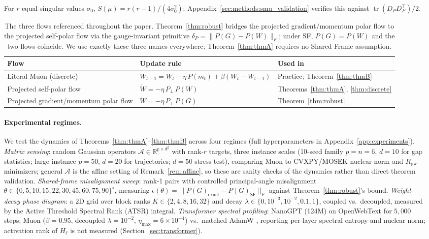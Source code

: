 \documentclass{article}
\begin{document}
For $r$ equal singular values $\sigma_0$, $S(\mu)=r(r-1)/(4\sigma_0^2)$; Appendix~\ref{sec:methods:smu_validation} verifies this against $\operatorname{tr}(D_P D_P^\top)/2$.

\begin{table}[h]
\centering\small
\caption{The three flows referenced throughout the paper. Theorem~\ref{thm:robust} bridges the projected gradient/momentum polar flow to the projected self-polar flow via the gauge-invariant primitive $\delta_P=\|P(G)-P(W)\|_F$; under \textsf{SF}, $P(G)=P(W)$ and the two flows coincide. We use exactly these three names everywhere; Theorem~\ref{thm:thmA} requires no Shared-Frame assumption.}
\label{tab:three_flows_main}
\begin{tabular}{@{}lll@{}}
\toprule
Flow & Update rule & Used in \\
\midrule
Literal Muon (discrete) & $W_{t+1} = W_t - \eta\,P(m_t) + \beta(W_t-W_{t-1})$ & Practice; Theorem~\ref{thm:thmB} \\
Projected self-polar flow & $\dot W = -\eta\,P_\perp\,P(W)$ & Theorems~\ref{thm:thmA}, \ref{thm:discrete} \\
Projected gradient/momentum polar flow & $\dot W = -\eta\,P_\perp\,P(G)$ & Theorem~\ref{thm:robust} \\
\bottomrule
\end{tabular}
\end{table}

\paragraph{Experimental regimes.}\label{sec:methods}%
We test the dynamics of Theorems~\ref{thm:thmA}--\ref{thm:thmB} across four regimes (full hyperparameters in Appendix~\ref{app:experiments}). \emph{Matrix sensing}: random Gaussian operators $\mathcal A\in\mathbb R^{p\times d^2}$ with rank-$r$ targets, three instance scales (10-seed family $p=n=6$, $d=10$ for gap statistics; large instance $p=50$, $d=20$ for trajectories; $d=50$ stress test), comparing Muon to CVXPY/MOSEK nuclear-norm and $R_{\mathrm{pw}}$ minimizers; general $\mathcal A$ is the affine setting of Remark~\ref{rem:affine}, so these are sanity checks of the dynamics rather than direct theorem validation. \emph{Shared-frame misalignment sweep}: rank-1 pairs with controlled principal-angle misalignment $\theta\in\{0,5,10,15,22,30,45,60,75,90\}^\circ$, measuring $\epsilon(\theta)=\|P(G)_{\mathrm{exact}}-P(G)_{\mathsf{SF}}\|_F$ against Theorem~\ref{thm:robust}'s bound. \emph{Weight-decay phase diagram}: a 2D grid over block ranks $K\in\{2,4,8,16,32\}$ and decay $\lambda\in\{0,10^{-3},10^{-2},0.1,1\}$, coupled vs.\ decoupled, measured by the Active Threshold Spectral Rank (ATSR) integral. \emph{Transformer spectral profiling}: NanoGPT (124M) on OpenWebText for $5{,}000$ steps; Muon ($\beta=0.95$, decoupled $\lambda=10^{-2}$, $\eta_{\max}=6\!\times\!10^{-4}$) vs.\ matched AdamW \citep{loshchilov2017adamw}, reporting per-layer spectral entropy and nuclear norm; activation rank of $H_\ell$ is not measured (Section~\ref{sec:transformer}).
\end{document}
